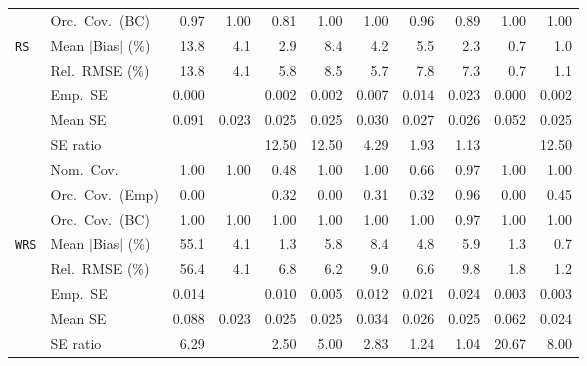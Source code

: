 \begin{landscape}
\begin{longtable}{llrrrrrrrrr}
 & Orc.\ Cov.\ (BC) & \cellcolor{ranktwo}0.97 & \cellcolor{rankthree}1.00 & 0.81 & \cellcolor{rankthree}1.00 & \cellcolor{rankthree}1.00 & \cellcolor{rankone}0.96 & 0.89 & \cellcolor{rankthree}1.00 & \cellcolor{rankthree}1.00 \\
\addlinespace[2pt]
\quad \texttt{RS} & Mean $|$Bias$|$ (\%) & 13.8 & 4.1 & 2.9 & 8.4 & 4.2 & 5.5 & \cellcolor{rankthree}2.3 & \cellcolor{rankone}0.7 & \cellcolor{ranktwo}1.0 \\
 & Rel.\ RMSE (\%) & 13.8 & \cellcolor{rankthree}4.1 & 5.8 & 8.5 & 5.7 & 7.8 & 7.3 & \cellcolor{rankone}0.7 & \cellcolor{ranktwo}1.1 \\
 & Emp.\ SE & 0.000 &  & 0.002 & 0.002 & 0.007 & 0.014 & 0.023 & 0.000 & 0.002 \\
 & Mean SE & 0.091 & 0.023 & 0.025 & 0.025 & 0.030 & 0.027 & 0.026 & 0.052 & 0.025 \\
 & SE ratio &  &  & 12.50 & 12.50 & \cellcolor{rankthree}4.29 & \cellcolor{ranktwo}1.93 & \cellcolor{rankone}1.13 &  & 12.50 \\
 & Nom.\ Cov. & \cellcolor{ranktwo}1.00 & \cellcolor{ranktwo}1.00 & 0.48 & \cellcolor{ranktwo}1.00 & \cellcolor{ranktwo}1.00 & \cellcolor{rankthree}0.66 & \cellcolor{rankone}0.97 & \cellcolor{ranktwo}1.00 & \cellcolor{ranktwo}1.00 \\
 & Orc.\ Cov.\ (Emp) & 0.00 &  & \cellcolor{rankthree}0.32 & 0.00 & 0.31 & \cellcolor{rankthree}0.32 & \cellcolor{rankone}0.96 & 0.00 & \cellcolor{ranktwo}0.45 \\
 & Orc.\ Cov.\ (BC) & \cellcolor{ranktwo}1.00 & \cellcolor{ranktwo}1.00 & \cellcolor{ranktwo}1.00 & \cellcolor{ranktwo}1.00 & \cellcolor{ranktwo}1.00 & \cellcolor{ranktwo}1.00 & \cellcolor{rankone}0.97 & \cellcolor{ranktwo}1.00 & \cellcolor{ranktwo}1.00 \\
\addlinespace[2pt]
\quad \texttt{WRS} & Mean $|$Bias$|$ (\%) & 55.1 & \cellcolor{rankthree}4.1 & \cellcolor{ranktwo}1.3 & 5.8 & 8.4 & 4.8 & 5.9 & \cellcolor{ranktwo}1.3 & \cellcolor{rankone}0.7 \\
 & Rel.\ RMSE (\%) & 56.4 & \cellcolor{rankthree}4.1 & 6.8 & 6.2 & 9.0 & 6.6 & 9.8 & \cellcolor{ranktwo}1.8 & \cellcolor{rankone}1.2 \\
 & Emp.\ SE & 0.014 &  & 0.010 & 0.005 & 0.012 & 0.021 & 0.024 & 0.003 & 0.003 \\
 & Mean SE & 0.088 & 0.023 & 0.025 & 0.025 & 0.034 & 0.026 & 0.025 & 0.062 & 0.024 \\
 & SE ratio & 6.29 &  & \cellcolor{rankthree}2.50 & 5.00 & 2.83 & \cellcolor{ranktwo}1.24 & \cellcolor{rankone}1.04 & 20.67 & 8.00 \\

\end{longtable}
\end{landscape}
